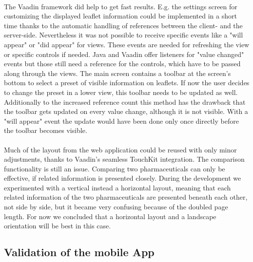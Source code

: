 \\
The Vaadin framework did help to get fast results. E.g. the settings screen for customizing the displayed leaflet information could be implemented in a short time thanks to the automatic handling of references between the client- and the server-side. Nevertheless it was not possible to receive specific events like a "will appear" or "did appear" for views. These events are needed for refreshing the view or specific controls if needed. Java and Vaadin offer listeners for "value changed" events but those still need a reference for the controls, which have to be passed along through the views. The main screen contains a toolbar at the screen's bottom to select a preset of visible information on leaflets. If now the user decides to change the preset in a lower view, this toolbar needs to be updated as well. Additionally to the increased reference count this method has the drawback that the toolbar gets updated on every value change, although it is not visible. With a "will appear" event the update would have been done only once directly before the toolbar becomes visible.
\\
\\
Much of the layout from the web application could be reused with only minor adjustments, thanks to Vaadin's seamless TouchKit integration. The comparison functionality is still an issue. Comparing two pharmaceuticals can only be effective, if related information is presented closely. During the development we experimented with a vertical instead a horizontal layout, meaning that each related information of the two pharmaceuticals are presented beneath each other, not side by side, but it became very confusing because of the doubled page length. For now we concluded that a horizontal layout and a landscape orientation will be best in this case.

\subsection{Validation of the mobile App}
\label{subsec:Validation}
